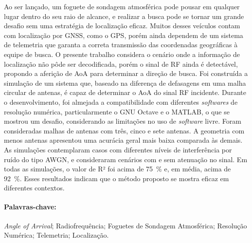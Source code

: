% 

Ao ser lançado, um foguete de sondagem atmosférica pode pousar em qualquer lugar dentro do seu raio de alcance, e realizar a busca pode se tornar um grande desafio sem uma estratégia de localização eficaz.
Muitos desses veículos contam com localização por \acs{GNSS}, como o \acs{GPS}, porém ainda dependem de um sistema de telemetria que garanta a correta transmissão das coordenadas geográficas à equipe de busca.
O presente trabalho considera o cenário onde a informação de localização não pôde ser decodificada, porém o sinal de \acs{RF} ainda é detectável, propondo a aferição de \acf{AoA} para determinar a direção de busca.
Foi construída a simulação de um sistema que, baseado na diferença de defasagens em uma malha circular de antenas, é capaz de determinar o \acs{AoA} do sinal \acs{RF} incidente.
Durante o desenvolvimento, foi almejada a compatibilidade com diferentes \textit{softwares} de resolução numérica, particularmente o GNU Octave e o MATLAB, o que se mostrou um desafio, considerando as limitações no uso de \textit{software} livre.
Foram consideradas malhas de antenas com três, cinco e sete antenas.
A geometria com menos antenas apresentou uma acurácia geral mais baixa comparada às demais.
As simulações contemplaram casos com diferentes níveis de interferência por ruído do tipo \acs{AWGN}, e consideraram cenários com e sem atenuação no sinal.
Em todas as simulações, o valor de R² foi acima de \qty{75}{\percent} e, em média, acima de \qty{92}{\percent}.
Esses resultados indicam que o método proposto se mostra eficaz em diferentes contextos.

\paragraph*{Palavras-chave:} \textit{Angle of Arrival}; Radiofrequência; Foguetes de Sondagem Atmosférica; Resolução Numérica; Telemetria; Localização.

